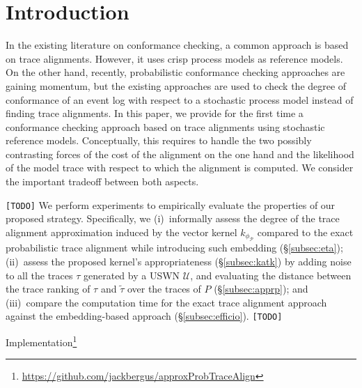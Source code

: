 
\section{Introduction}\label{introduction}


In the existing literature on conformance checking, a common approach is based on trace alignments. However, it uses crisp process 
models as reference models. On the other hand, recently, probabilistic conformance checking approaches are gaining momentum, but 
the existing approaches are used to check the degree of conformance of an event log with respect to a stochastic process model 
instead of finding trace alignments.
In this paper, we provide for the first time a conformance checking approach based on trace alignments using stochastic reference 
models. Conceptually, this requires to handle the two possibly contrasting forces of the cost of the alignment on the one hand and the 
likelihood of the model trace with respect to which the alignment is computed. We consider the important tradeoff between both
aspects. 





\texttt{\color{red}[TODO]}
We perform experiments to empirically evaluate the properties of our proposed  strategy. Specifically, we
	(i)~{informally assess the degree of the trace alignment approximation induced by the vector kernel $k_{\phi_\mathcal{P}}$ 
	  compared to the exact probabilistic trace alignment while introducing such embedding (\S\ref{subsec:eta});}
	(ii)~assess the proposed kernel's appropriateness (\S\ref{subsec:katk}) by adding noise to all the traces $\tau$ generated by 
	  a USWN $\mathcal{U}$, and evaluating the distance between the trace ranking of $\tau$ and 
	  $\tilde{\tau}$ over the traces of $P$ (\S\ref{subsec:apprp}); and 
	(iii)~compare the computation time for the exact trace alignment approach against the embedding-based approach (\S\ref{subsec:efficio}).
\texttt{\color{red}[TODO]}

Implementation\footnote{\url{https://github.com/jackbergus/approxProbTraceAlign}}